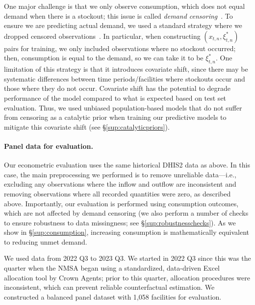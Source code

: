 \documentclass[12pt]{article}
\begin{document}
One major challenge is that we only observe consumption, which does not equal demand when there is a stockout; this issue is called \emph{demand censoring}~\cite{besbes2013implications}. To ensure we are predicting actual demand, we used a standard strategy where we dropped censored observations~\cite{greene2000econometric}. In particular, when constructing $(x_{t,n},\xi_{t,n}^*)$ pairs for training, we only included observations where no stockout occurred; then, consumption is equal to the demand, so we can take it to be $\xi_{t,n}^*$. One limitation of this strategy is that it introduces covariate shift, since there may be systematic differences between time periods/facilities where stockouts occur and those where they do not occur. Covariate shift has the potential to degrade performance of the model compared to what is expected based on test set evaluation. Thus, we used unbiased population-based models that do not suffer from censoring as a catalytic prior when training our predictive models to mitigate this covariate shift (see \S\ref{sup:catalyticpriors}).

\paragraph{Panel data for evaluation.}

Our econometric evaluation uses the same historical DHIS2 data as above. In this case, the main preprocessing we performed is to remove unreliable data---i.e., excluding any observations where the inflow and outflow are inconsistent and removing observations where all recorded quantities were zero, as described above. Importantly, our evaluation is performed using consumption outcomes, which are not affected by demand censoring (we also perform a number of checks to ensure robustness to data missingness; see \S\ref{sup:robustnesschecks}). As we show in \S\ref{sup:consumption}, increasing consumption is mathematically equivalent to reducing unmet demand.

We used data from 2022 Q3 to 2023 Q3. We started in 2022 Q3 since this was the quarter when the NMSA began using a standardized, data-driven Excel allocation tool by Crown Agents; prior to this quarter, allocation procedures were inconsistent, which can prevent reliable counterfactual estimation. We constructed a balanced panel dataset with 1,058 facilities for evaluation.
\end{document}
